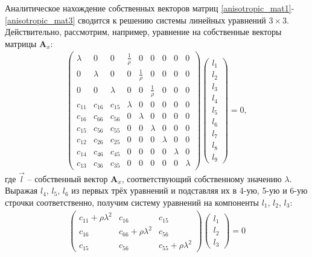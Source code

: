 	Аналитическое нахождение собственных векторов матриц \eqref{anisotropic_mat1}-\eqref{anisotropic_mat3} сводится к решению системы линейных уравнений $3\times3$.{}
	Действительно, рассмотрим, например, уравнение на собственные векторы матрицы $\mathbf{A}_x$:
\begin{align}
\label{eigenvector_equation}
\left( \begin{array}{cccccccccccc}
\lambda & 0 & 0 & \frac 1 \rho & 0 & 0 & 0 & 0 & 0 \\ 
0 & \lambda & 0 & 0 & \frac 1 \rho & 0 & 0 & 0 & 0 \\ 
0 & 0 & \lambda & 0 & 0 & \frac 1 \rho & 0 & 0 & 0 \\ 
c_{11} & c_{16} & c_{15} & \lambda & 0 & 0 & 0 & 0 & 0 \\ 
c_{16} & c_{66} & c_{56} & 0 & \lambda & 0 & 0 & 0 & 0 \\
c_{15} & c_{56} & c_{55} & 0 & 0 & \lambda & 0 & 0 & 0 \\ 
c_{12} & c_{26} & c_{25} & 0 & 0 & 0 & \lambda & 0 & 0 \\ 
c_{14} & c_{46} & c_{45} & 0 & 0 & 0 & 0 & \lambda & 0 \\ 
c_{13} & c_{36} & c_{35} & 0 & 0 & 0 & 0 & 0 & \lambda
\end{array} \right){}
\left( \begin{array}{cccccccccccc}
l_1 \\
l_2 \\
l_3 \\
l_4 \\
l_5 \\
l_6 \\
l_7 \\
l_8 \\
l_9
\end{array} \right){}
 = 0,
\end{align}
	где $\vec{l}$ -- собственный вектор $\mathbf{A}_x$, соответствующий собственному значению $\lambda$.
	Выражая $l_4$, $l_5$, $l_6$ из первых трёх уравнений и подставляя их в 4-ую, 5-ую и 6-ую строчки соответственно, получим систему уравнений на компоненты $l_1$, $l_2$, $l_3$:
\begin{align}
\label{simple_eigenvector_equation}
\left( \begin{array}{cccccccccccc}
c_{11} + \rho\lambda^{2} & c_{16} & c_{15} \\ 
c_{16} & c_{66} + \rho\lambda^{2} & c_{56} \\ 
c_{15} & c_{56} & c_{55} + \rho\lambda^{2} 
\end{array} \right){}
\left( \begin{array}{cccccccccccc}
l_1 \\
l_2 \\
l_3
\end{array} \right){}
 = 0
\end{align}	
		
